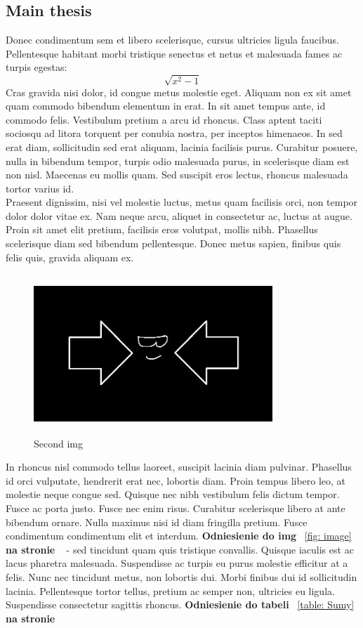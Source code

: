 \documentclass[12pt,a4paper]{article}
\begin{document}
\subsection{Main thesis}
	Donec condimentum sem et libero scelerisque, cursus ultricies ligula faucibus. Pellentesque habitant morbi tristique senectus et netus et malesuada fames ac turpis egestas:
	\[\sqrt{x^2-1}\] 
	Cras gravida nisi dolor, id congue metus molestie eget. \cite{B1} Aliquam non ex sit amet quam commodo bibendum elementum in erat. In sit amet tempus ante, id commodo felis. Vestibulum pretium a arcu id rhoncus. Class aptent taciti sociosqu ad litora torquent 			per conubia nostra, per inceptos himenaeos. 
	In  sed erat diam, sollicitudin sed erat aliquam, lacinia facilisis purus. Curabitur posuere, nulla in bibendum tempor, turpis odio malesuada purus, in scelerisque diam est non nisl. Maecenas eu mollis quam. Sed suscipit eros lectus, rhoncus 			malesuada tortor varius id. \\Praesent dignissim, nisi vel molestie luctus, metus quam facilisis orci, non tempor dolor dolor vitae ex. Nam neque arcu, aliquet in consectetur ac, luctus at augue. Proin sit amet elit pretium, facilisis eros volutpat, mollis nibh. 			Phasellus scelerisque diam sed bibendum pellentesque. Donec metus sapien, finibus quis felis quis, gravida aliquam ex.
	

	\begin{figure}[H]
		\centering
		\includegraphics[width=9cm, height=6cm]{img2.jpg}
		\caption{Second img}
		\label{fig: image2}
	\end{figure}

In rhoncus nisl commodo tellus laoreet, suscipit lacinia diam pulvinar. \cite{A1} Phasellus id orci vulputate, hendrerit erat nec, lobortis diam. \cite{C5} Proin tempus libero leo, at molestie neque congue sed. Quisque nec nibh vestibulum felis dictum tempor. \cite{Un1} Fusce ac porta justo. Fusce nec enim risus. Curabitur scelerisque libero at ante bibendum ornare. Nulla maximus nisi id diam fringilla pretium. Fusce condimentum condimentum elit et interdum. \textbf{Odniesienie do img} ~\ref{fig: image} \textbf{na stronie} ~\pageref{fig: image} - sed tincidunt quam quis tristique convallis.
	Quisque iaculis est ac lacus pharetra malesuada. Suspendisse ac turpis eu purus molestie efficitur at a felis. \cite{M1} Nunc nec tincidunt metus, non lobortis dui. Morbi finibus dui id sollicitudin lacinia. Pellentesque tortor tellus, pretium ac semper non, ultricies eu ligula. Suspendisse consectetur sagittis rhoncus. \textbf{Odniesienie do tabeli} ~\ref{table: Sumy} \textbf{na stronie} ~\pageref{table: Sumy}

\newpage
	
	

	
\end{document}
